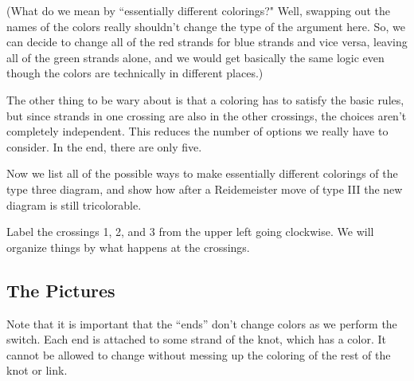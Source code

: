 \documentclass[12pt,letterpaper]{article}
\theoremstyle{definition}
\begin{document}
(What do we mean by ``essentially different colorings?" Well, swapping out the names of the colors really shouldn't change the type of the argument here. So, we can decide to change all of the red strands for blue strands and vice versa, leaving all of the green strands alone, and we would get basically the same logic even though the colors are technically in different places.)

The other thing to be wary about is that a coloring has to satisfy the basic rules, but since strands in one crossing are also in the other crossings, the choices aren't completely independent. This reduces the number of options we really have to consider.
In the end, there are only five.

Now we list all of the possible ways to make essentially different colorings of the type three diagram, and show how after a Reidemeister move of type III the new diagram is still tricolorable.

Label the crossings 1, 2, and 3 from the upper left going clockwise.
We will organize things by what happens at the crossings.

\clearpage

\subsection*{The Pictures}
Note that it is important that the ``ends'' don't change colors as we perform the switch. 
Each end is attached to some strand of the knot, which has a color.
It cannot be allowed to change without messing up the coloring of the rest of the knot or link.
\end{document}

